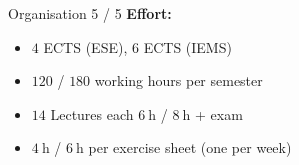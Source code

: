 
\begin{frame}{Organisation 5 / 5}
  \textbf{Effort:}
  \begin{itemize}
    \item
      {\color{MainA}$\num{4}$ ECTS} (ESE),
      {\color{MainA}$\num{6}$ ECTS} (IEMS)
    \item
      {\color{MainA}$\num{120}$} /
      {\color{MainA}$\num{180}$}
      working hours per semester
    \item
      {\color{MainA}$\num{14}$} Lectures each
      {\color{MainA}$\SI{6}{\hour}$} /
      {\color{MainA}$\SI{8}{\hour}$} + exam
    \item
      {\color{MainA}$\SI{4}{\hour}$} /
      {\color{MainA}$\SI{6}{\hour}$} per exercise sheet (one per week)
  \end{itemize}
\end{frame}
